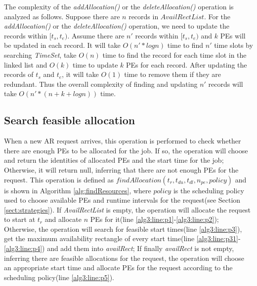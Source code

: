 \documentclass[preprint,12pt]{elsarticle}
\begin{document}
The complexity of the \emph{addAllocation()} or the \emph{deleteAllocation()} operation is analyzed as follows. Suppose there are $n$ records in $AvailRectList$. For the \emph{addAllocation()} or the \emph{deleteAllocation()} operation, we need to update the records within $[t_s,t_e)$. Assume there are $n'$ records within
$[t_s,t_e)$ and $k$ PEs will be updated in each record. It will take $O(n'*logn)$ time to find $n'$ time slots by searching \emph{TimeSet}, take $O(n)$ time to find the record for each time slot in the linked list and $O(k)$ time to update $k$ PEs for each record. After updating the records of $t_s$ and $t_e$, it will take $O(1)$ time to remove them if they are redundant. Thus the overall complexity of finding and updating $n'$ records will take $O(n'*(n+k+logn))$ time.


\subsection{Search feasible allocation}
\label{sec:search}
When a new AR request arrives, this operation is performed to check whether there are enough PEs to be allocated for the job. If so, the operation will choose and return the identities of allocated PEs and the start time for the job; Otherwise, it will return null, inferring that there are not enough PEs for the request. This operation is defined as $findAllocation(t_r,t_{du},t_{dl},n_{pe},policy)$ and is shown in Algorithm \ref{alg:findResources}, where $policy$ is the scheduling policy used to choose available PEs and runtime intervals for the request(see Section \ref{sect:strategies}). If \emph{AvailRectList} is empty, the operation will allocate the request to start at $t_r$ and allocate $n$ PEs for it(line \ref{alg3:line:p1}-\ref{alg3:line:p2}); Otherwise, the operation will search for feasible start times(line \ref{alg3:line:p3}), get the maximum availability rectangle of every start time(line \ref{alg3:line:p31}-\ref{alg3:line:p4}) and add them into \emph{availRect}; If finally \emph{availRect} is not empty, inferring there are feasible allocations for the request, the operation will choose an appropriate start time and allocate PEs for the request according to the scheduling policy(line \ref{alg3:line:p5}).
\end{document}
